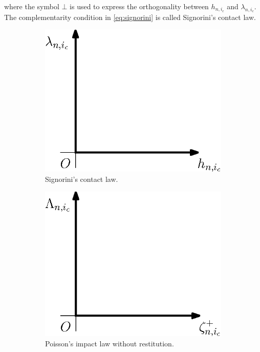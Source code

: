 \documentclass[../DC2017114Bouma.tex]{subfiles}
\begin{document}
where the symbol $\bot$ is used to express the orthogonality between $h_{n,i_c}$ and $\lambda_{n,i_c}$. The complementarity condition in \eqref{eq:signorini} is called Signorini's contact law.
\begin{figure}[h]
\centering
\begin{subfigure}{0.3\textwidth}
\centering
\includegraphics[width=\linewidth]{signorinicontact.eps}
\caption{Signorini's contact law.}\label{fig:signorinicontact}
\end{subfigure}
\qquad
\begin{subfigure}{0.3\textwidth}
\centering
\includegraphics[width=\linewidth]{poissonimpact.eps}
\caption{Poisson's impact law without restitution.}\label{fig:poissonimpact}
\end{subfigure}
\caption{}
\end{figure}
\end{document}
